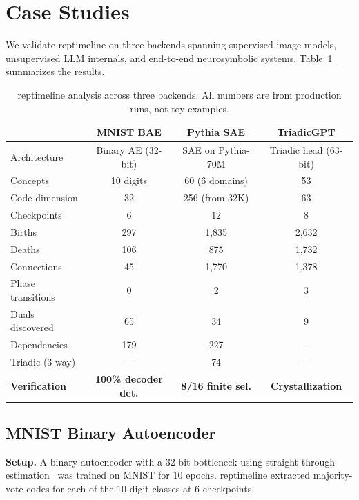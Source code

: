 \documentclass[11pt]{article}
\begin{document}
\section{Case Studies}
\label{sec:cases}

We validate reptimeline on three backends spanning supervised image models, unsupervised LLM internals, and end-to-end neurosymbolic systems. Table~\ref{tab:results} summarizes the results.

\begin{table}[h]
\centering
\caption{reptimeline analysis across three backends. All numbers are from production runs, not toy examples.}
\label{tab:results}
\small
\begin{tabular}{lccc}
\toprule
& \textbf{MNIST BAE} & \textbf{Pythia SAE} & \textbf{TriadicGPT} \\
\midrule
Architecture & Binary AE (32-bit) & SAE on Pythia-70M & Triadic head (63-bit) \\
Concepts & 10 digits & 60 (6 domains) & 53 \\
Code dimension & 32 & 256 (from 32K) & 63 \\
Checkpoints & 6 & 12 & 8 \\
\midrule
Births & 297 & 1{,}835 & 2{,}632 \\
Deaths & 106 & 875 & 1{,}732 \\
Connections & 45 & 1{,}770 & 1{,}378 \\
Phase transitions & 0 & 2 & 3 \\
\midrule
Duals discovered & 65 & 34 & 9 \\
Dependencies & 179 & 227 & --- \\
Triadic (3-way) & --- & 74 & --- \\
\midrule
\textbf{Verification} & \textbf{100\% decoder det.} & \textbf{8/16 finite sel.} & \textbf{Crystallization} \\
\bottomrule
\end{tabular}
\end{table}


\subsection{MNIST Binary Autoencoder}

\textbf{Setup.} A binary autoencoder with a 32-bit bottleneck using straight-through estimation~\citep{bengio2013estimating} was trained on MNIST for 10 epochs. reptimeline extracted majority-vote codes for each of the 10 digit classes at 6 checkpoints.
\end{document}
